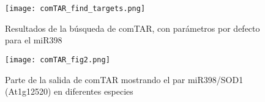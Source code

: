 \begin{figure}[htbp!] 
    \centering    
    \texttt{[image: comTAR\_find\_targets.png]}
    \caption[Resultados del comTAR para el miR398]{Resultados de la búsqueda de comTAR, con parámetros por defecto para el miR398}
    \label{fig:comTAR_find_targets}
\end{figure}


\begin{figure}[htbp!] 
    \centering    
    \texttt{[image: comTAR\_fig2.png]}
    \caption[Salida del comTAR]{Parte de la salida de comTAR mostrando el par miR398/SOD1 (At1g12520) en diferentes especies}
    \label{fig:comTAR_fig2}
\end{figure}



